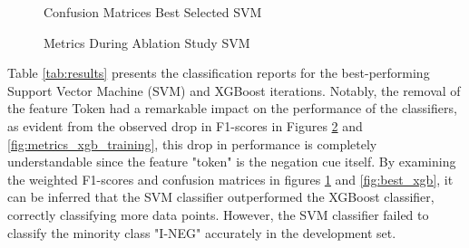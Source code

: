 \begin{figure}[!h]
\centering
  \caption{Confusion Matrices Best Selected SVM}
  \label{fig:best_svm}
\end{figure}


\begin{figure}[!ht]
\centering
  \caption{Metrics During Ablation Study SVM}
  \label{fig:metrics_svm_training}
\end{figure}

Table \ref{tab:results} presents the classification reports for the best-performing Support Vector Machine (SVM) and XGBoost iterations. Notably, the removal of the feature Token had a remarkable impact on the performance of the classifiers, as evident from the observed drop in F1-scores in Figures \ref{fig:metrics_svm_training} and \ref{fig:metrics_xgb_training}, this drop in performance is completely understandable since the feature "token" is the negation cue itself. By examining the weighted F1-scores and confusion matrices in figures \ref{fig:best_svm} and \ref{fig:best_xgb}, it can be inferred that the SVM classifier outperformed the XGBoost classifier, correctly classifying more data points. However, the SVM classifier failed to classify the minority class "I-NEG" accurately in the development set.

